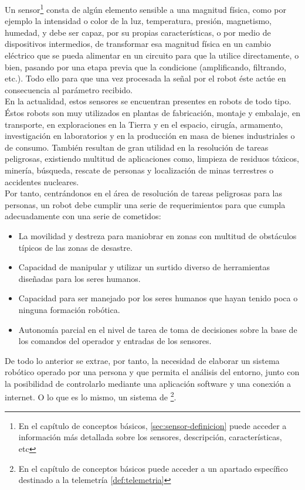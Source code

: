 Un sensor\footnote{En el capítulo de conceptos básicos, \ref{sec:sensor-definicion} puede acceder a información más detallada sobre los sensores, descripción, características, etc}
consta de algún elemento sensible a una magnitud física, como por ejemplo la intensidad o color de la luz, temperatura, presión, magnetismo, humedad, y debe ser capaz,
por su propias características, o por medio de dispositivos intermedios, de transformar esa magnitud física en un cambio eléctrico que se pueda alimentar en un circuito para
que la utilice directamente, o bien, pasando por una etapa previa que la condicione (amplificando, filtrando, etc.). Todo ello para que una vez procesada la señal por el robot
 éste actúe en consecuencia al parámetro recibido.\\

En la actualidad, estos sensores se encuentran presentes en robots de todo tipo. Éstos robots son muy utilizados en plantas de fabricación, montaje y embalaje, en transporte, en exploraciones en la Tierra y en el espacio, cirugía, armamento, investigación en laboratorios y 
en la producción en masa de bienes industriales o de consumo. También resultan de gran utilidad en la resolución de tareas peligrosas, existiendo multitud de aplicaciones como, 
limpieza de residuos tóxicos, minería, búsqueda, rescate de personas y localización de minas terrestres o accidentes nucleares.\\

Por tanto, centrándonos en el área de resolución de tareas peligrosas para las personas, un robot debe cumplir una serie de requerimientos para que cumpla adecuadamente con una serie 
de cometidos:\\

\begin{itemize}
 \item La movilidad y destreza para maniobrar en zonas con multitud de obstáculos típicos de las zonas de desastre.
 \item Capacidad de manipular y utilizar un surtido diverso de herramientas diseñadas para los seres humanos.
 \item Capacidad para ser manejado por los seres humanos que hayan tenido poca o ninguna formación robótica.
 \item Autonomía parcial en el nivel de tarea de toma de decisiones sobre la base de los comandos del operador y entradas de los sensores.
\end{itemize}

De todo lo anterior se extrae, por tanto, la necesidad de elaborar un sistema robótico operado por una persona y que permita el análisis del entorno, junto con la posibilidad de controlarlo mediante una 
aplicación software y una conexión a internet. O lo que es lo mismo, un sistema de \footnote{En el capítulo de conceptos básicos puede acceder a un apartado específico destinado a la telemetría \ref{def:telemetria}}.\\

